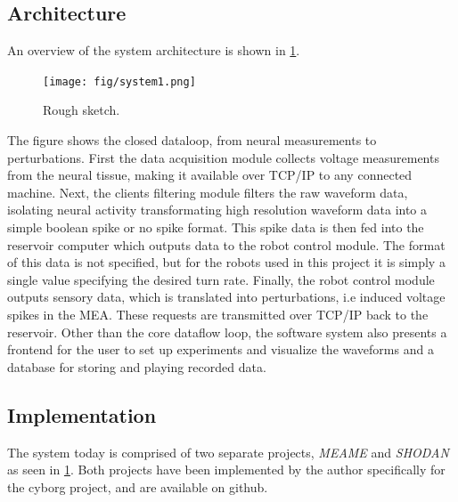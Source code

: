 \subsection{Architecture}
An overview of the system architecture is shown in \ref{figOverview}.
\begin{figure}[h!]
  \centering
  \texttt{[image: fig/system1.png]}
  \caption{Rough sketch.
  }
  \label{figOverview}
\end{figure}
The figure shows the closed dataloop, from neural measurements to perturbations.
First the data acquisition module collects voltage measurements from the neural
tissue, making it available over TCP/IP to any connected machine.
%
Next, the clients filtering module filters the raw waveform data, isolating
neural activity transformating high resolution waveform data into a simple
boolean spike or no spike format.
%
This spike data is then fed into the reservoir computer which outputs data to
the robot control module.
The format of this data is not specified, but for the robots used in this
project it is simply a single value specifying the desired turn rate.
%
Finally, the robot control module outputs sensory data, which is translated into
perturbations, i.e induced voltage spikes in the MEA.
These requests are transmitted over TCP/IP back to the reservoir.
%
Other than the core dataflow loop, the software system also presents a frontend
for the user to set up experiments and visualize the waveforms and a database
for storing and playing recorded data.
\subsection{Implementation}
The system today is comprised of two separate projects, \emph{MEAME} and
\emph{SHODAN} as seen in \ref{figOverview}.
Both projects have been implemented by the author specifically for the cyborg
project, and are available on github.
%
%
